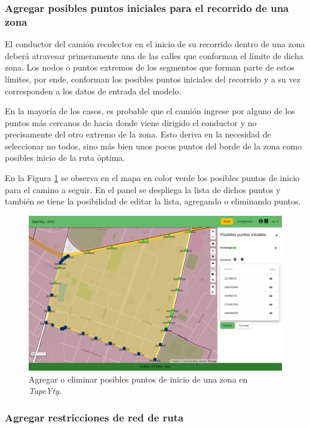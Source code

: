 \subsubsection{Agregar posibles puntos iniciales para el recorrido de una zona}

El conductor del camión recolector en el inicio de su recorrido dentro de una zona deberá atravesar primeramente una de las calles que conforman el límite de dicha zona. Los nodos o puntos extremos de los segmentos que forman parte de estos límites, por ende, conforman los posibles puntos iniciales del recorrido y a su vez corresponden a los datos de entrada del modelo. 

En la mayoría de los casos, es probable que el camión ingrese por alguno de los puntos más cercanos de hacia donde viene dirigido el conductor y no precisamente del otro extremo de la zona. Esto deriva en la necesidad de seleccionar no todos, sino más bien unos pocos puntos del borde de la zona como posibles inicio de la ruta óptima.

En la Figura \ref{fig:puntosIniciales} se observa en el mapa en color verde los posibles puntos de inicio para el camino a seguir. En el panel se despliega la lista de dichos puntos y también se tiene la posibilidad de editar la lista, agregando o eliminando puntos.

\begin{figure}[H]
\centerline{\includegraphics[width=\textwidth]{puntosIniciales.png}}
\caption{Agregar o eliminar posibles puntos de inicio de una zona en \textit{TapeYty}.}
\label{fig:puntosIniciales}
\end{figure}

\subsubsection{Agregar restricciones de red de ruta}

